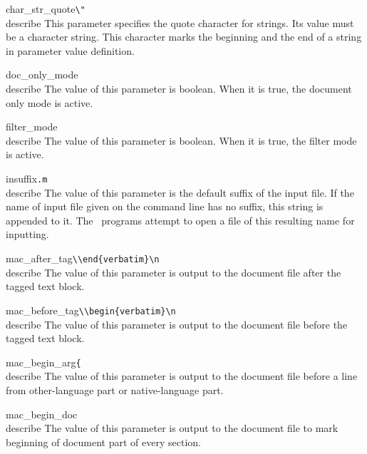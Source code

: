 \begin{describepara}{char_str_quote}{\verb*|\"|}\\describe
This parameter specifies the quote character for strings. Its value
must be a character string. This character marks the beginning and the
end of a string in parameter value definition.
\end{describepara}
\begin{describepara}{doc_only_mode}{\verb*||}\\describe
The value of this parameter is boolean. When it is true, the document
only mode is active.
\end{describepara}
\begin{describepara}{filter_mode}{\verb*||}\\describe
The value of this parameter is boolean. When it is true, the filter
mode is active.
\end{describepara}
\begin{describepara}{insuffix}{\verb*|.m|}\\describe
The value of this parameter is the default suffix of the input file.
If the name of input file given on the command line has no suffix,
this string is appended to it. The \mweb\ programs attempt to open a
file of this resulting name for inputting.
\end{describepara}
\begin{describepara}{mac_after_tag}{\verb*|\\end{verbatim}\n|}\\describe
The value of this parameter is output to the document file after the
tagged text block.
\end{describepara}
\begin{describepara}{mac_before_tag}{\verb*|\\begin{verbatim}\n|}\\describe
The value of this parameter is output to the document file before the
tagged text block.
\end{describepara}
\begin{describepara}{mac_begin_arg}{\verb*|{|}\\describe
The value of this parameter is output to the document file before a line
from other-language part or native-language part.
\end{describepara}
\begin{describepara}{mac_begin_doc}{\verb*||}\\describe
The value of this parameter is output to the document file to mark
beginning of document part of every section.
\end{describepara}
